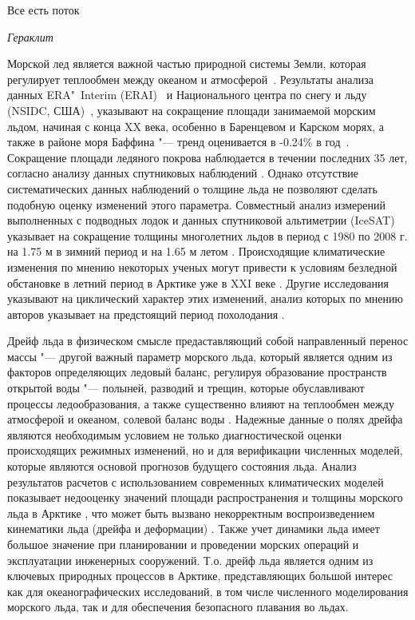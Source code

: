 
{\actuality} \epigraph{Все есть поток}{\textit{Гераклит}}
Морской лед является важной частью природной системы Земли, которая регулирует теплообмен между океаном и атмосферой~\cite{vaughan2013observations}. Результаты анализа данных ERA"~Interim (ERAI)~\cite{dee2011era} и Национального центра по снегу и льду (NSIDC, США)~\cite{cavalieri1996updated}, указывают на сокращение площади занимаемой морским льдом, начиная с конца XX века, особенно в Баренцевом и Карском морях, а также в районе моря Баффина "--- тренд оценивается в -0.24\% в год~\cite{park2015attribution}. Сокращение площади ледяного покрова наблюдается в течении последних 35 лет, согласно анализу данных спутниковых наблюдений \cite{simmonds2015comparing}. Однако отсутствие систематических данных наблюдений о толщине льда не позволяют сделать подобную оценку изменений этого параметра. Совместный анализ измерений выполненных с подводных лодок и данных спутниковой альтиметрии (IceSAT) указывает на сокращение толщины многолетних льдов в период с 1980 по 2008 г. на 1.75 м в зимний период и на 1.65 м летом \cite{rothrock2008decline,kwok2009thinning}. Происходящие климатические изменения по мнению некоторых ученых могут привести к условиям безледной обстановке в летний период в Арктике уже в XXI веке  \cite{stroeve2007arctic,wang2009sea,massonnet2012constraining,Laliber_2016,Jahn_2016}. Другие исследования указывают на циклический характер этих изменений, анализ которых по мнению авторов указывает на предстоящий период похолодания \cite{Frolov2010,Frolov2007_1,Frolov2007_2}.

Дрейф льда в физическом смысле предаставляющий собой направленный перенос массы "--- другой важный параметр морского льда, который является одним из факторов определяющих ледовый баланс, регулируя образование пространств открытой воды "--- полыней, разводий и трещин, которые обуславливают процессы ледообразования, а также существенно влияют на теплообмен между атмосферой и океаном, солевой баланс воды \cite{jordan1999heat,Makshtas1977}. Надежные данные о полях дрейфа являются необходимым условием не только диагностической оценки происходящих режимных изменений, но и для верификации численных моделей, которые являются основой прогнозов будущего состояния льда. Анализ результатов расчетов с использованием современных климатических  моделей показывает недооценку значений площади распространения и толщины морского льда в Арктике \cite{stroeve2007arctic}, что может быть вызвано некорректным воспроизведением кинематики льда (дрейфа и деформации)  \cite{rampal2011ipcc}. Также учет динамики льда имеет большое значение при планировании и проведении морских операций и эксплуатации инженерных сооружений. Т.о. дрейф льда является одним из ключевых природных процессов в Арктике, представляющих большой интерес как для океанографических исследований, в том числе численного моделирования морского льда, так и для обеспечения безопасного плавания во льдах.

